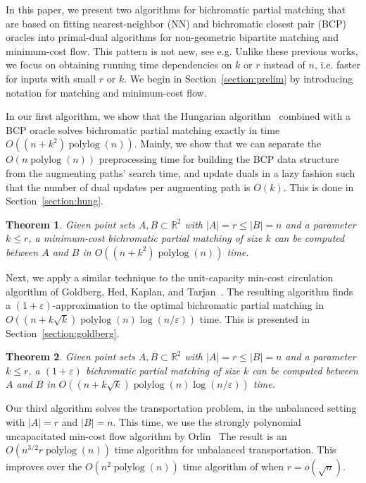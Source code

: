 \documentclass[11pt]{article}
\def\polylog{\mathop{\mathrm{polylog}}}
\def\eps{\varepsilon}
\theoremstyle{plain}
\newtheorem{theorem}{Theorem}
\begin{document}
In this paper, we present two algorithms for bichromatic partial matching
that are based on fitting nearest-neighbor (NN) and bichromatic closest pair
(BCP) oracles into primal-dual algorithms for non-geometric bipartite matching
and minimum-cost flow.
This pattern is not new, see e.g. %
Unlike these previous works, we focus on obtaining running time dependencies on
$k$ or $r$ instead of $n$, i.e. faster for inputs with small $r$ or $k$.
We begin in Section~\ref{section:prelim} by introducing notation for matching
and minimum-cost flow.


In our first algorithm, we show that the Hungarian algorithm~\cite{Kuhn55}
combined with a BCP oracle solves bichromatic partial matching exactly in time
$O((n + k^2)\polylog(n))$.
Mainly, we show that we can separate the $O(n\polylog(n))$ preprocessing time
for building the BCP data structure from the augmenting paths' search time,
and update duals in a lazy fashion such that the number of dual updates per
augmenting path is $O(k)$.
This is done in Section~\ref{section:hung}.

\begin{theorem}
\label{theorem:hung}
Given point sets $A, B \subset \mathbb{R}^2$ with $|A| = r \leq |B| = n$ and a
parameter $k \leq r$, a minimum-cost bichromatic partial matching of size $k$
can be computed between $A$ and $B$ in $O((n + k^2)\polylog(n))$ time.
\end{theorem}


Next, we apply a similar technique to the unit-capacity min-cost circulation
algorithm of Goldberg, Hed, Kaplan, and Tarjan~\cite{GHKT17}.
The resulting algorithm finds a $(1 + \eps)$-approximation to the optimal
bichromatic partial matching in $O((n + k\sqrt{k})\polylog(n)\log(n/\eps))$
time.
This is presented in Section~\ref{section:goldberg}.

\begin{theorem}
\label{theorem:gmcm}
Given point sets $A, B \subset \mathbb{R}^2$ with $|A| = r \leq |B| = n$ and a
parameter $k \leq r$, a $(1+\eps)$ bichromatic partial matching of size $k$
can be computed between $A$ and $B$ in
$O((n + k\sqrt{k})\polylog(n)\log(n/\eps))$ time.
\end{theorem}


Our third algorithm solves the transportation problem, in the unbalanced
setting with $|A| = r$ and $|B| = n$.
This time, we use the strongly polynomial uncapacitated min-cost flow algorithm
by Orlin~%
The result is an $O(n^{3/2}r\polylog(n))$ time algorithm for unbalanced
transportation.
This improves over the $O(n^2 \polylog(n))$ time algorithm of %
when $r = o(\sqrt{n})$.
\end{document}
